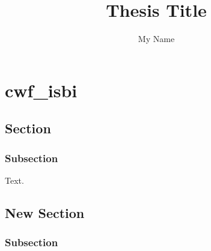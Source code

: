 \documentclass{puthesis}
\author{My Name}
\title{Thesis Title}
\begin{document}
\chapter{cwf_isbi}

\section{Section}

\subsection{Subsection}

Text.

\section{New Section}

\subsection{Subsection}
\end{document}
